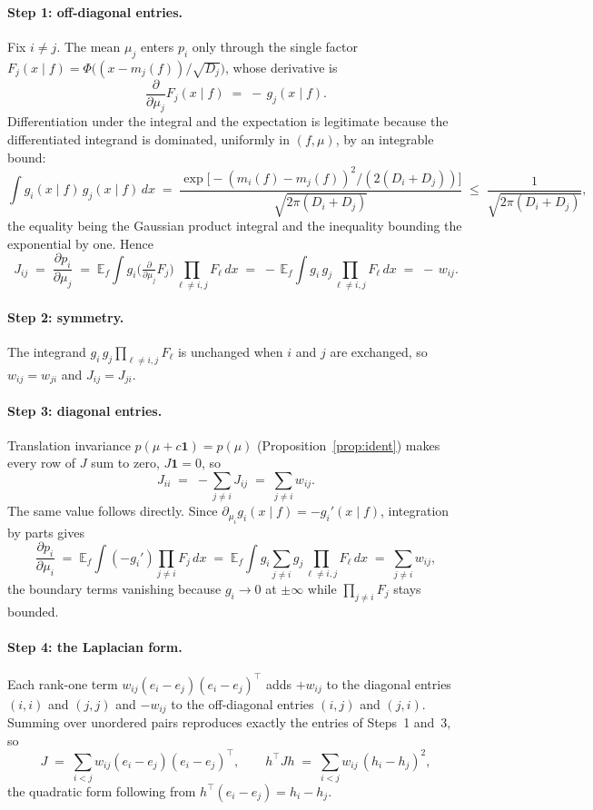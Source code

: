 \documentclass[12pt]{article}
\theoremstyle{remark}
\newcommand{\E}{\mathbb{E}}
\begin{document}
\paragraph{Step 1: off-diagonal entries.} Fix $i\ne j$. The mean $\mu_j$
enters $p_i$ only through the single factor
$F_j(x\mid f) = \Phi\big((x - m_j(f))/\sqrt{D_j}\big)$, whose derivative is
\[
\frac{\partial}{\partial \mu_j} F_j(x\mid f) \;=\; -\,g_j(x\mid f).
\]
Differentiation under the integral and the expectation is legitimate
because the differentiated integrand is dominated, uniformly in
$(f,\mu)$, by an integrable bound:
\[
\int g_i(x\mid f)\, g_j(x\mid f)\,dx
\;=\; \frac{\exp\!\big[-(m_i(f)-m_j(f))^2 / (2(D_i+D_j))\big]}
{\sqrt{2\pi(D_i+D_j)}}
\;\le\; \frac{1}{\sqrt{2\pi(D_i+D_j)}} ,
\]
the equality being the Gaussian product integral and the inequality
bounding the exponential by one. Hence
\[
J_{ij} \;=\; \frac{\partial p_i}{\partial \mu_j}
\;=\; \E_f \int g_i \Big(\tfrac{\partial}{\partial\mu_j}F_j\Big)
\prod_{\ell\ne i,j}F_\ell\,dx
\;=\; -\,\E_f \int g_i\, g_j \prod_{\ell\ne i,j} F_\ell\,dx
\;=\; -\,w_{ij}.
\]

\paragraph{Step 2: symmetry.} The integrand
$g_i\, g_j \prod_{\ell\ne i,j}F_\ell$ is unchanged when $i$ and $j$ are
exchanged, so $w_{ij}=w_{ji}$ and $J_{ij}=J_{ji}$.

\paragraph{Step 3: diagonal entries.} Translation invariance
$p(\mu+c\mathbf{1})=p(\mu)$ (Proposition~\ref{prop:ident}) makes every
row of $J$ sum to zero, $J\mathbf{1}=0$, so
\[
J_{ii} \;=\; -\sum_{j\ne i} J_{ij} \;=\; \sum_{j\ne i} w_{ij}.
\]
The same value follows directly. Since
$\partial_{\mu_i} g_i(x\mid f) = -g_i'(x\mid f)$, integration by parts gives
\[
\frac{\partial p_i}{\partial \mu_i}
\;=\; \E_f \int (-g_i')\prod_{j\ne i}F_j\,dx
\;=\; \E_f \int g_i \sum_{j\ne i} g_j \prod_{\ell\ne i,j}F_\ell\,dx
\;=\; \sum_{j\ne i} w_{ij},
\]
the boundary terms vanishing because $g_i\to 0$ at $\pm\infty$ while
$\prod_{j\ne i}F_j$ stays bounded.

\paragraph{Step 4: the Laplacian form.} Each rank-one term
$w_{ij}(e_i-e_j)(e_i-e_j)^\top$ adds $+w_{ij}$ to the diagonal entries
$(i,i)$ and $(j,j)$ and $-w_{ij}$ to the off-diagonal entries $(i,j)$ and
$(j,i)$. Summing over unordered pairs reproduces exactly the entries of
Steps~1 and~3, so
\[
J \;=\; \sum_{i<j} w_{ij}(e_i-e_j)(e_i-e_j)^\top,
\qquad
h^\top J h \;=\; \sum_{i<j} w_{ij}\,(h_i-h_j)^2 ,
\]
the quadratic form following from $h^\top(e_i-e_j) = h_i-h_j$.
\end{document}
